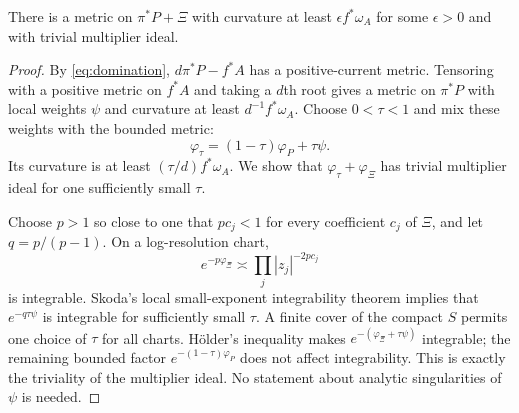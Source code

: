 \begin{lemma}\label{lem:mixture}
There is a metric on $\pi^*P+\Xi$ with curvature at least $\epsilon f^*\omega_A$ for some $\epsilon>0$ and with trivial multiplier ideal.
\end{lemma}
\begin{proof}
By \eqref{eq:domination}, $d\pi^*P-f^*A$ has a positive-current metric. Tensoring with a positive metric on $f^*A$ and taking a $d$th root gives a metric on $\pi^*P$ with local weights $\psi$ and curvature at least $d^{-1}f^*\omega_A$. Choose $0<\tau<1$ and mix these weights with the bounded metric:
\[
\varphi_\tau=(1-\tau)\varphi_P+\tau\psi.
\]
Its curvature is at least $(\tau/d)f^*\omega_A$. We show that $\varphi_\tau+\varphi_\Xi$ has trivial multiplier ideal for one sufficiently small $\tau$.

Choose $p>1$ so close to one that $pc_j<1$ for every coefficient $c_j$ of $\Xi$, and let $q=p/(p-1)$. On a log-resolution chart,
\[
e^{-p\varphi_\Xi}\asymp\prod_j|z_j|^{-2pc_j}
\]
is integrable. Skoda's local small-exponent integrability theorem \cite{Skoda1972} implies that $e^{-q\tau\psi}$ is integrable for sufficiently small $\tau$. A finite cover of the compact $S$ permits one choice of $\tau$ for all charts. H\"older's inequality makes $e^{-(\varphi_\Xi+\tau\psi)}$ integrable; the remaining bounded factor $e^{-(1-\tau)\varphi_P}$ does not affect integrability. This is exactly the triviality of the multiplier ideal. No statement about analytic singularities of $\psi$ is needed.
\end{proof}


